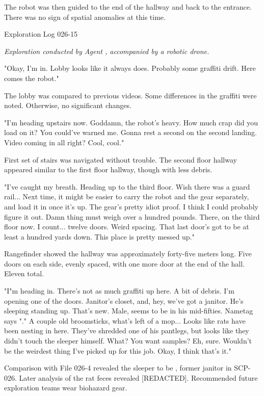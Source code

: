 The robot was then guided to the end of the hallway and back to the entrance. There was no sign of spatial anomalies at this time.
\bigskip
\begin{flushleft}
Exploration Log 026-15
\end{flushleft}
\textsl{Exploration conducted by Agent , accompanied by a robotic drone.}

"Okay, I'm in. Lobby looks like it always does. Probably some graffiti drift. Here comes the robot."

The lobby was compared to previous videos. Some differences in the graffiti were noted. Otherwise, no significant changes.

"I'm heading upstairs now. Goddamn, the robot's heavy. How much crap did you load on it? You could've warned me. Gonna rest a second on the second landing. Video coming in all right? Cool, cool."

First set of stairs was navigated without trouble. The second floor hallway appeared similar to the first floor hallway, though with less debris.

"I've caught my breath. Heading up to the third floor. Wish there was a guard rail... Next time, it might be easier to carry the robot and the gear separately, and load it in once it's up. The gear's pretty idiot proof. I think I could probably figure it out. Damn thing must weigh over a hundred pounds. There, on the third floor now. I count... twelve doors. Weird spacing. That last door's got to be at least a hundred yards down. This place is pretty messed up."

Rangefinder showed the hallway was approximately forty-five meters long. Five doors on each side, evenly spaced, with one more door at the end of the hall. Eleven total.

"I"m heading in. There's not as much graffiti up here. A bit of debris. I'm opening one of the doors. Janitor's closet, and, hey, we've got a janitor. He's sleeping standing up. That's new. Male, seems to be in his mid-fifties. Nametag says "." A couple old broomsticks, what's left of a mop... Looks like rats have been nesting in here. They've shredded one of his pantlegs, but looks like they didn't touch the sleeper himself. What? You want samples? Eh, sure. Wouldn't be the weirdest thing I've picked up for this job. Okay, I think that's it."

Comparison with File 026-4 revealed the sleeper to be  , former janitor in SCP-026. Later analysis of the rat feces \linebreak revealed [REDACTED]. Recommended future exploration teams wear biohazard gear.

